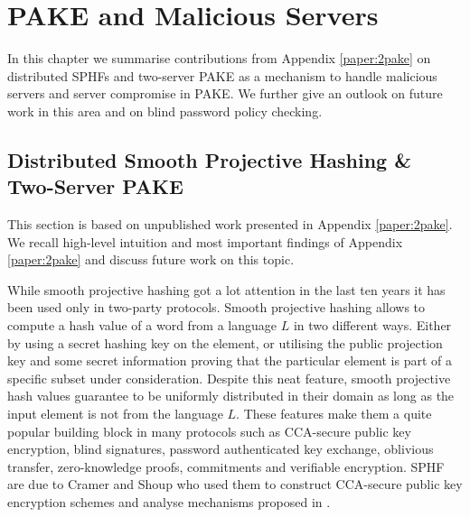 \chapter{PAKE and Malicious Servers}\label{ch:malservers}
In this chapter we summarise contributions from Appendix \ref{paper:2pake} on distributed \aclp{SPHF} and two-server \ac{PAKE} as a mechanism to handle malicious servers and server compromise in \acl{PAKE}.
We further give an outlook on future work in this area and on blind password policy checking.

\section{Distributed Smooth Projective Hashing \& Two-Server PAKE} \label{sec:twopake}
This section is based on unpublished work presented in Appendix \ref{paper:2pake}.
We recall high-level intuition and most important findings of Appendix \ref{paper:2pake} and discuss future work on this topic.

While smooth projective hashing got a lot attention in the last ten years it has been used only in two-party protocols.
Smooth projective hashing allows to compute a hash value of a word from a language $L$ in two different ways.
Either by using a secret hashing key on the element, or utilising the public projection key and some secret information proving that the particular element is part of a specific subset under consideration.
Despite this neat feature, smooth projective hash values guarantee to be uniformly distributed in their domain as long as the input element is not from the language $L$.
These features make them a quite popular building block in many protocols such as \ac{CCA}-secure public key encryption, blind signatures, password authenticated key exchange, oblivious transfer, zero-knowledge proofs, commitments and verifiable encryption.
\ac{SPHF} are due to Cramer and Shoup \cite{Cramer2001} who used them to construct \ac{CCA}-secure public key encryption schemes and analyse mechanisms proposed in \cite{Cramer1998}.

